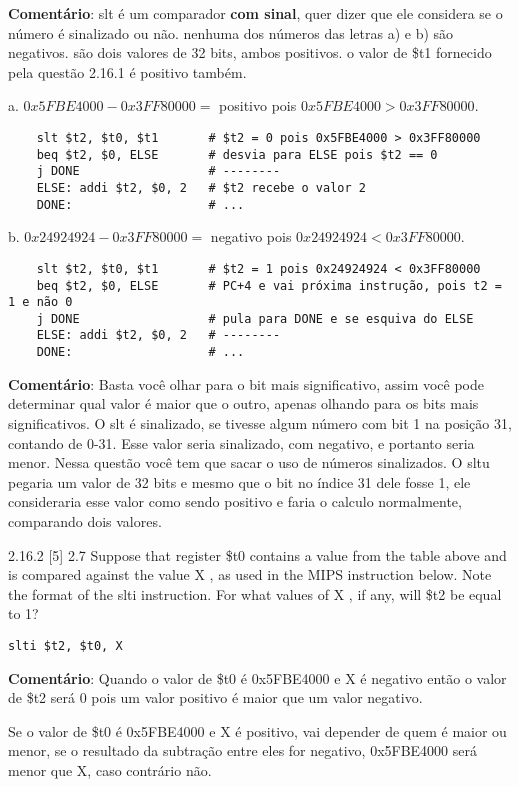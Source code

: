 \documentclass{article}
\begin{document}
\textbf{Comentário}: slt é um comparador \textbf{com sinal}, quer dizer que ele
considera se o número é sinalizado ou não. nenhuma dos números das letras a) e
b) são negativos. são dois valores de 32 bits, ambos positivos. o valor de \$t1
fornecido pela questão 2.16.1 é positivo também.

a. $0x5FBE4000 - 0x3FF80000 =$ positivo pois $0x5FBE4000 > 0x3FF80000$.

  \begin{verbatim}
    slt $t2, $t0, $t1       # $t2 = 0 pois 0x5FBE4000 > 0x3FF80000
    beq $t2, $0, ELSE       # desvia para ELSE pois $t2 == 0
    j DONE                  # --------
    ELSE: addi $t2, $0, 2   # $t2 recebe o valor 2
    DONE:                   # ...
  \end{verbatim}

b. $0x24924924 - 0x3FF80000 =$ negativo pois $0x24924924 < 0x3FF80000$.

  \begin{verbatim}
    slt $t2, $t0, $t1       # $t2 = 1 pois 0x24924924 < 0x3FF80000
    beq $t2, $0, ELSE       # PC+4 e vai próxima instrução, pois t2 = 1 e não 0
    j DONE                  # pula para DONE e se esquiva do ELSE
    ELSE: addi $t2, $0, 2   # --------
    DONE:                   # ...
  \end{verbatim}

\textbf{Comentário}: Basta você olhar para o bit mais significativo, assim você
pode determinar qual valor é maior que o outro, apenas olhando para os bits mais
significativos. O slt é sinalizado, se tivesse algum número com bit 1 na posição
31, contando de 0-31. Esse valor seria sinalizado, com negativo, e  portanto
seria menor. Nessa questão você tem que sacar o uso de números sinalizados. O
sltu pegaria um valor de 32 bits e mesmo que o bit no índice 31 dele fosse 1,
ele consideraria esse valor como sendo positivo e faria o calculo normalmente,
comparando dois valores.

2.16.2  [5] 2.7 Suppose that register \$t0 contains a value from the table
above and is compared against the value X , as used in the MIPS instruction
below. Note the format of the slti instruction. For what values of X , if any,
will \$t2 be equal to 1?

\verb|slti $t2, $t0, X|

\textbf{Comentário}: Quando o valor de \$t0 é 0x5FBE4000 e X é negativo então o 
valor de \$t2 será 0 pois um valor positivo é maior que um valor negativo.

Se o valor de \$t0 é 0x5FBE4000 e X é positivo, vai depender de quem é maior ou 
menor, se o resultado da subtração entre eles for negativo, 0x5FBE4000 será 
menor que X, caso contrário não.
\end{document}
